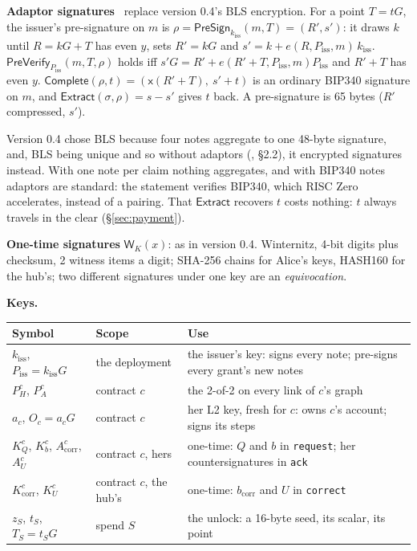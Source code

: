 \documentclass[11pt]{article}
\theoremstyle{plain}
\theoremstyle{definition}
\newcommand{\bcorr}{b_{\mathrm{corr}}}
\newcommand{\tx}[1]{\texttt{#1}}
\newcommand{\xo}[1]{\mathsf{x}(#1)}
\newcommand{\PSign}{\mathsf{PreSign}}
\newcommand{\PVfy}{\mathsf{PreVerify}}
\newcommand{\Compl}{\mathsf{Complete}}
\newcommand{\Extr}{\mathsf{Extract}}
\newcommand{\Wots}{\mathsf{W}}
\newcommand{\kiss}{k_{\mathrm{iss}}}
\newcommand{\Piss}{P_{\mathrm{iss}}}
\newcommand{\PH}{P_H^{c}}
\newcommand{\Oc}{O_c}
\newcommand{\KQ}{K_{Q}^{c}}
\newcommand{\Kb}{K_{b}^{c}}
\newcommand{\Kcorr}{K_{\mathrm{corr}}^{c}}
\newcommand{\KU}{K_{U}^{c}}
\newcommand{\Acorr}{A_{\mathrm{corr}}^{c}}
\newcommand{\AU}{A_{U}^{c}}
\begin{document}
\textbf{Adaptor signatures}~\cite{poelstra,aumayr} replace version 0.4's
BLS encryption. For a point $T = tG$, the issuer's pre-signature on $m$
is $\rho = \PSign_{\kiss}(m, T) = (R', s')$: it draws $k$ until $R = kG
+ T$ has even $y$, sets $R' = kG$ and $s' = k + e(R, \Piss, m)\,\kiss$.
$\PVfy_{\Piss}(m, T, \rho)$ holds iff $s'G = R' + e(R' + T, \Piss,
m)\Piss$ and $R' + T$ has even $y$. $\Compl(\rho, t) = (\xo{R' + T},\ s'
+ t)$ is an ordinary BIP340 signature on $m$, and $\Extr(\sigma, \rho) =
s - s'$ gives $t$ back. A pre-signature is 65 bytes ($R'$ compressed,
$s'$).

Version 0.4 chose BLS because four notes aggregate to one 48-byte
signature, and, BLS being unique and so without adaptors
(\cite{grants04}, \S2.2), it encrypted signatures instead. With one note
per claim nothing aggregates, and with BIP340 notes adaptors are
standard: the statement verifies BIP340, which RISC Zero accelerates,
instead of a pairing. That $\Extr$ recovers $t$ costs nothing: $t$
always travels in the clear (\S\ref{sec:payment}).

\textbf{One-time signatures} $\Wots_K(x)$: as in version 0.4. Winternitz,
4-bit digits plus checksum, 2 witness items a digit; SHA-256 chains for
Alice's keys, HASH160 for the hub's; two different signatures under one
key are an \emph{equivocation}.

\textbf{Keys.}
\begin{center}
\begin{tabularx}{\linewidth}{llL}
\toprule
Symbol & Scope & Use \\
\midrule
$\kiss$, $\Piss = \kiss G$ & the deployment & the issuer's key: signs every note; pre-signs every grant's new notes \\
$\PH$, $P_A^c$ & contract $c$ & the 2-of-2 on every link of $c$'s graph \\
$a_c$, $\Oc = a_cG$ & contract $c$ & her L2 key, fresh for $c$: owns $c$'s account; signs its steps \\
$\KQ$, $\Kb$, $\Acorr$, $\AU$ & contract $c$, hers & one-time: $Q$ and $b$ in \tx{request}; her countersignatures in \tx{ack} \\
$\Kcorr$, $\KU$ & contract $c$, the hub's & one-time: $\bcorr$ and $U$ in \tx{correct} \\
$z_S$, $t_S$, $T_S = t_S G$ & spend $S$ & the unlock: a 16-byte seed, its scalar, its point \\
\bottomrule
\end{tabularx}
\end{center}
\end{document}
